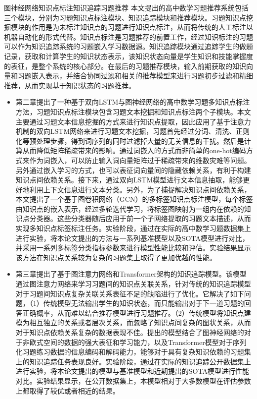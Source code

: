 \begin{abstractC}{图神经网络}{知识点标注}{知识追踪}{习题推荐}{}
    本文提出的高中数学习题推荐系统包括三个模块，分别为习题知识点标注模块、知识追踪模块和推荐模块。习题知识点挖掘模块的作用是为未标注知识点的习题进行知识点标注，从而将传统的人工标注以机器自动化的形式代替。知识点标注是习题推荐的前置工作，经过知识标注的习题可以作为知识追踪系统的习题嵌入学习数据源。知识追踪模块通过追踪学生的做题记录，获取和计算学生的知识状态表示，该知识状态向量是学生知识和技能掌握度的表征，是整个系统的核心部分。在最后的习题推荐模块，输入前期获取的知识向量和习题嵌入表示，并结合协同过滤和相关的推荐模型来进行习题初步过滤和精细推荐，从而实现基于知识状态的习题推荐。
    \begin{itemize}
        \item 第二章提出了一种基于双向LSTM与图神经网络的高中数学习题多知识点标注方法，习题知识点标注模块包含习题文本挖掘和知识点标注两个子模块。本文主要通过习题文本信息挖掘的方式来进行知识点提取，因此应用了基于注意力机制的双向LSTM网络来进行习题文本挖掘，习题首先经过分词、清洗、正则化等预处理步骤，得到词序列的同时过滤掉大量的无关信息的干扰。然后是计算从而降低矩阵稀疏带来的影响。通过词嵌入的方式而非简单的one-hot编码方式来作为词嵌入，可以防止输入词向量矩阵过于稀疏带来的维数灾难等问题。另外通过嵌入学习的方式，也可以表征词向量间的隐藏依赖关系，有利于构建知识点间依赖关系。接下来，通过双向LSTM模型进行文本信息抽取，能够更好地利用上下文信息进行文本分类。另外，为了捕捉解决知识点间依赖关系，本文提出了一个基于图卷积网络（GCN）的多标签知识点标注模型，每个标签由知识点的嵌入表示，经过多轮迭代学习，将标签图映射为一组内在依赖的知识点分类器。这些分类器随后应用于前一个子网络提取的习题文本描述，从而实现多知识点标签标注任务。实验阶段，通过在实际的高中数学习题数据集上进行实验，将本论文提出的方法与一系列基准模型以及SOTA模型进行对比，并采用一系列多标签分类指标参数来进行模型性能比较和评估。实验结果显示该方法在知识点关系较为复杂的习题集上取得了更加优越的性能。
        \item 第三章提出了基于图注意力网络和Transformer架构的知识追踪模型。该模型通过图注意力网络来学习习题间的知识点关联关系，针对传统的知识追踪模型对于习题间知识点复杂关联关系表征不足的缺陷进行了优化。它解决了如下问题，（1）传统模型无法输出学生的知识状态，而只能输出对于下一道习题的回答正确概率，从而难以结合推荐模型进行习题推荐。（2）传统模型将知识点建模为相互独立的关系或者层次关系，而忽略了知识点间复杂的图状关系，从而对于知识点依赖关系复杂的数据表现不佳。提出的模型结合了图神经网络的对于非欧式空间的数据的强大表征和学习能力，以及Transformer模型对于序列化习题练习数据的信息编码和解码能力，能够对于具有复杂知识依赖的习题集上的知识追踪任务表现良好。实验阶段，通过在实际的知识追踪公开数据集上进行实验，将本论文提出的模型与基准模型和近期提出的SOTA模型进行性能对比。实验结果显示，在公开数据集上，本模型相对于大多数模型在评估参数上都取得了较优或者相近的结果。

\end{itemize}
\end{abstractC}
